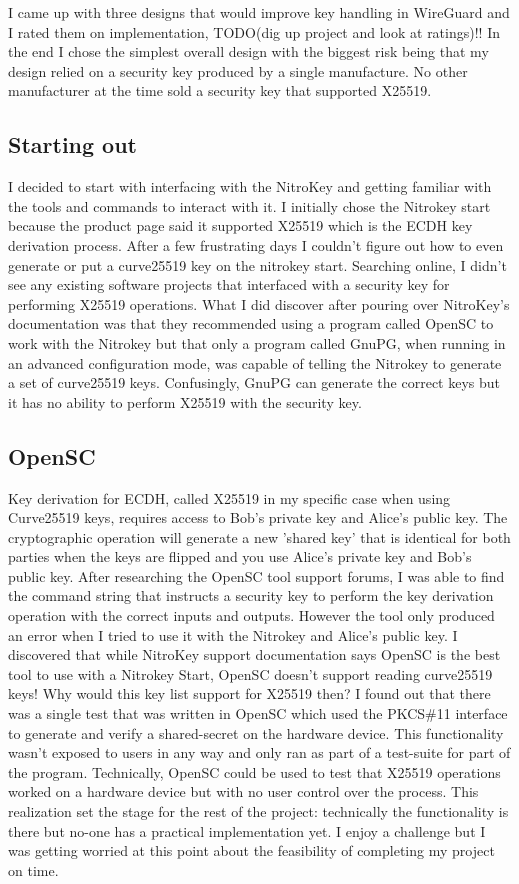 \documentclass [11pt, proquest] {uwthesis}[2020/02/24]
\begin{document}
I came up with three designs that would improve key handling in WireGuard and I rated them on implementation, TODO(dig up project and look at ratings)!! In the end I chose the simplest overall design with the biggest risk being that my design relied on a security key produced by a single manufacture. No other manufacturer at the time sold a security key that supported X25519.

\subsection {Starting out}

I decided to start with interfacing with the NitroKey and getting familiar with the tools and commands to interact with it. I initially chose the Nitrokey start because the product page said it supported X25519\cite{noauthor_nitrokey_nodate} which is the ECDH key derivation process. After a few frustrating days I couldn't figure out how to even generate or put a curve25519 key on the nitrokey start. Searching online, I didn't see any existing software projects that interfaced with a security key for performing X25519 operations. What I did discover after pouring over NitroKey's documentation was that they recommended using a program called OpenSC to work with the Nitrokey but that only a program called GnuPG, when running in an advanced configuration mode, was capable of telling the Nitrokey to generate a set of curve25519 keys. Confusingly, GnuPG can generate the correct keys but it has no ability to perform X25519 with the security key.

\subsection {OpenSC}
Key derivation for ECDH, called X25519 in my specific case when using Curve25519 keys, requires access to Bob's private key and Alice's public key. The cryptographic operation will generate a new 'shared key' that is identical for both parties when the keys are flipped and you use Alice's private key and Bob's public key. 
After researching the OpenSC tool support forums, I was able to find the command string that instructs a  security key to perform the key derivation operation with the correct inputs and outputs. However the tool only produced an error when I tried to use it with the Nitrokey and Alice's public key. I discovered that while NitroKey support documentation says OpenSC is the best tool to use with a Nitrokey Start, OpenSC doesn't support reading curve25519 keys! Why would this key list support for X25519 then? I found out that there was a single test that was written in OpenSC which used the PKCS\#11 interface to generate and verify a shared-secret on the hardware device. This functionality wasn't exposed to users in any way and only ran as part of a test-suite for part of the program. Technically, OpenSC could be used to test that X25519 operations worked on a hardware device but with no user control over the process. This realization set the stage for the rest of the project: technically the functionality is there but no-one has a practical implementation yet. I enjoy a challenge but I was getting worried at this point about the feasibility of completing my project on time.
\end{document}
